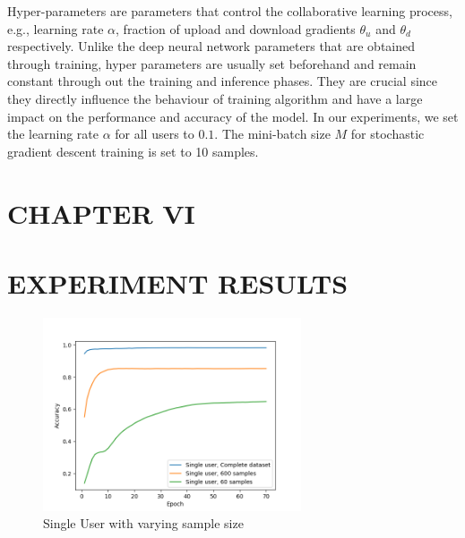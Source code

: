 \documentclass[letterpaper]{article}
\begin{document}
\begin{flushleft}
{Hyper-parameters are parameters that control the collaborative learning process, e.g., learning rate $\alpha$, fraction of upload and download gradients $\theta_u$ and $\theta_d$ respectively. Unlike
the deep neural network parameters that are obtained through training, hyper parameters are usually set beforehand and remain
constant through out the training and inference phases. They are crucial since they directly influence the behaviour of training
algorithm and have a large impact on the performance and accuracy of the model. In our experiments, we set the learning rate $\alpha$ for all
users to $0.1$. 
The mini-batch size $M$ for stochastic gradient descent training is set to 10 samples.


\pagebreak
\section*{CHAPTER VI}
\vspace{0.25in}
\section{EXPERIMENT RESULTS}


\begin{figure}[H]
  \centering
    \includegraphics[width=3in]{SingleUserBaselines.png}
    \caption[Single User with varying sample size.]{\label{fig:SingleUser} Single User with varying sample size}
  \end{figure}

}
\end{flushleft}
\end{document}
